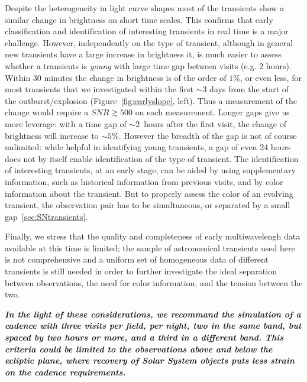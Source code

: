 Despite the heterogeneity in light curve shapes most of the transients show a similar change in brightness on short time scales. 
This confirms that early classification and identification of interesting transients in real time is a major challenge. However, independently on the type of transient, although in general new transients have a large increase in brightness it, is much easier to assess whether a transients is \emph{young} with large time gap between visits (e.g. 2 hours).
Within 30 minutes the change in brightness is of the order of $1\%$, or even less, for most transients that we investigated within the first $\sim3$ days from the start of the outburst/explosion (Figure~\ref{fig:earlyslope}, left). Thus a measurement of the change would require a $SNR\gtrsim500$ on each measurement. Longer gaps give us more leverage: with a time gap of $\sim2$~hours after the first visit, the change of brightness will increase to $\sim5\%$. However the breadth of the gap is not of course unlimited: while helpful in identifying young transients, a gap of even 24 hours does not by itself enable identification of the type of transient.  The identification of interesting transients, at an early stage, can be aided by using supplementary information, such as historical information from previous visits, and by color information about the transient. But to properly assess the color of an evolving transient, the observation pair has to be simultaneous, or separated by a small gap~\ref{sec:SNtransients}.

Finally, we stress that the quality and completeness of early multiwavelengh data available at this time is limited; the sample of astronomical transients used here is not comprehensive and a uniform set of homogeneous data of different transients is still needed in order to further investigate the ideal separation between observations, the need for color information, and the tension between the two.

{\bf\emph{In the light of these considerations, we recommand the simulation of a cadence with three visits per field, per night, two in the same band, but spaced by two hours or more, and a third in a different band. This criteria could be limited to the observations above and below the ecliptic plane, where recovery of Solar System objects puts less strain on the cadence requirements.}}

